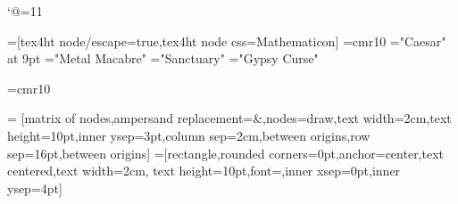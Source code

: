 \catcode`@=11\relax






\def\LD@Exercice@Display@Code{\eightpts}%
\LD@Exo@Label@Hide
\LD@Colors@Hide
\overfullrule=0pt%

	
\ifHtml
	
	=[tex4ht node/escape=true,tex4ht node css=Mathematicon]%
	\font\LD@Font@ResMathematica=cmr10%
\else
	\LD@AFour@Book
	\font\LD@Font@ResMathematica="Caesar" at 9pt
		\font\LD@Font@Gothic="Metal Macabre"\relax
	\font\LD@Font@Sanctuary="Sanctuary"\relax
	\font\LD@Font@Inferno="Gypsy Curse"\relax
\fi


\def\pgfutil@EveryShipout@Output{%
  \setbox255=\vbox{%
    \setbox0=\hbox{\pgfutil@abe\pgfutil@abc\global\let\pgfutil@abc\pgfutil@empty}%
    \wd0=0pt%
    \ht0=0pt%
    \dp0=0pt%
    \box0%
    \makeheadline
    \unvbox255%
    \makefootline
  }%
  \pgfutil@@EveryShipout@Org@Shipout\box\@cclv%
}


\def\LD@Public@Star{PT*}%

\def\Red#1{#1}%
\def\Blue#1{#1}%
\def\pspicture#1\endpspicture{}%
\long\def\IGNORE#1\IGNORE{}%

\font\SvgText=cmr10\relax


\tenrm

\def\TipSection{}%
\def\Tip#1{\ifHtml\Par\fi\EA\sidx\EA{\TipSection!#1}}%

\def\LD@Index@List{%
	Théorèmes,Théorème,Formules,Formule,Propriétés,Propriété,%
	Inégalités,Inégalité,Identités,Identité,Inégalités,Inégalité,%
	Distance,Intersection,Raisonnement,Récurrence,Relations,Relation,Point,%
	Lien,Espaces vectoriels,Espace vectoriel,Suites,Interprétation,%
	Fonctions,Produit,Loi,Déterminant,Principe,%
	Opérateur logique,Equation,Aire,Volume,Changement%
}%

= [matrix of nodes,ampersand replacement=\&,nodes={draw,text width=2cm,text height=10pt,inner ysep=3pt},column sep={2cm,between origins},row sep={16pt,between origins}]
=[rectangle,rounded corners=0pt,anchor=center,text centered,text width=2cm, text height=10pt,font=\SvgText,inner xsep=0pt,inner ysep=4pt]








